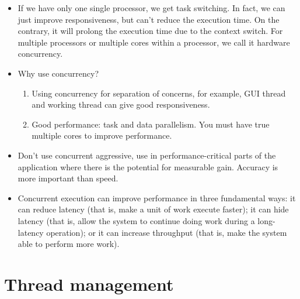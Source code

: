 \documentclass[a4paper,11pt,twoside]{book}
\begin{document}
\begin{itemize}
	\item If we have only one single processor, we get task switching. In fact, we can just improve responsiveness, but can't reduce the execution time. On the contrary, it will prolong the execution time due to the context switch. For multiple processors or multiple cores within a processor, we call it hardware concurrency. 
	
	\item Why use concurrency? 

	\begin{enumerate}
		\item Using concurrency for separation of concerns, for example, GUI thread and working thread can give good responsiveness.

		\item Good performance: task and data parallelism. You must have true multiple cores to improve performance. 
	\end{enumerate}

	\item Don't use concurrent aggressive, use in performance-critical parts of the application where there is the potential for measurable gain. Accuracy is more important than speed. 
	
	\item Concurrent execution can improve performance in three fundamental ways: it can reduce latency (that is, make a unit of work execute faster); it can hide latency (that is, allow the system to continue doing work during a long-latency operation); or it can increase throughput (that is, make the system able to perform more work). 
\end{itemize}

\section{Thread management}
\end{document}
